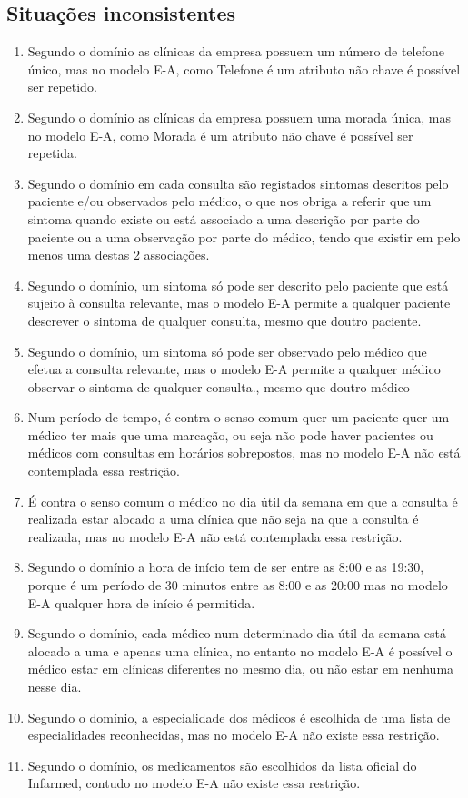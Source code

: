 \documentclass{article}
\begin{document}
\subsection{Situações inconsistentes}
\begin{enumerate}
    \item Segundo o domínio as clínicas da empresa possuem um número de telefone único, mas no modelo E-A, como Telefone é um atributo não chave é possível ser repetido.
    \item Segundo o domínio as clínicas da empresa possuem uma morada única, mas no modelo E-A, como Morada é um atributo não chave é possível ser repetida.
    \item Segundo o domínio em cada consulta são registados sintomas descritos pelo paciente e/ou observados pelo médico, o que nos obriga a referir que um sintoma quando existe ou está associado a uma descrição por parte do paciente ou a uma observação por parte do médico, tendo que existir em pelo menos uma destas 2 associações.
    \item Segundo o domínio, um sintoma só pode ser descrito pelo paciente que está sujeito à consulta relevante, mas o modelo E-A permite a qualquer paciente descrever o sintoma de qualquer consulta, mesmo que doutro paciente.
    \item Segundo o domínio, um sintoma só pode ser observado pelo médico que efetua a consulta relevante, mas o modelo E-A permite a qualquer médico observar o sintoma de qualquer consulta., mesmo que doutro médico
    \item Num período de tempo, é contra o senso comum quer um paciente quer um médico ter mais que uma marcação, ou seja não pode haver pacientes ou médicos com consultas em horários sobrepostos, mas no modelo E-A não está contemplada essa restrição.
    \item É contra o senso comum o médico no dia útil da semana em que a consulta é realizada estar alocado a uma clínica que não seja na que a consulta é realizada, mas no modelo E-A não está contemplada essa restrição.
    \item Segundo o domínio a hora de início tem de ser entre as 8:00 e as 19:30, porque é um período de 30 minutos entre as 8:00 e as 20:00 mas no modelo E-A qualquer hora de início é permitida.
    \item Segundo o domínio, cada médico num determinado dia útil da semana está alocado a uma e apenas uma clínica, no entanto no modelo E-A é possível o médico estar em clínicas diferentes no mesmo dia, ou não estar em nenhuma nesse dia.
    \item Segundo o domínio, a especialidade dos médicos é escolhida de uma lista de especialidades reconhecidas, mas no modelo E-A não existe essa restrição. 
    \item Segundo o domínio, os medicamentos são escolhidos da lista oficial do Infarmed, contudo no modelo E-A não existe essa restrição.
\end{enumerate}
\end{document}
